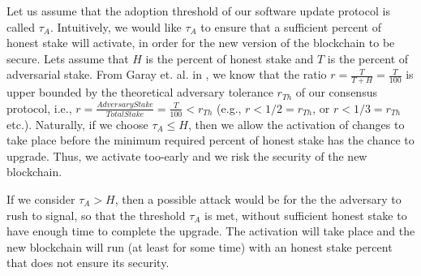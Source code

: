 Let us assume that the adoption threshold of our software update protocol is called $\tau_A$. %
 Intuitively, we would like $\tau_A$ to ensure that a sufficient percent of honest stake will activate, in order for the new version of the blockchain to be secure. Lets assume that $H$ is the percent of honest stake and $T$ is the percent of adversarial stake. From Garay et. al. in \cite{sok}, we know that the ratio $r = \frac{T}{T+H} = \frac{T}{100}$ is upper bounded by the theoretical adversary tolerance $r_{Th}$ of our consensus protocol, i.e., $r = \frac{AdversaryStake}{TotalStake} = \frac{T}{100} < r_{Th}$ (e.g., $r < 1/2 = r_{Th}$, or $r < 1/3 = r_{Th}$ etc.).
 Naturally, if we choose $\tau_A \leq H$, then we allow the activation of changes to take place before the minimum required percent of honest stake has the chance to upgrade. Thus, we activate too-early and we risk the security of the new blockchain. 

If we consider $\tau_A > H$, then a possible attack would be for the the adversary to rush to signal, so that the threshold $\tau_A$ is met, without sufficient honest stake to have enough time to complete the upgrade. The activation will take place and the new blockchain will run (at least for some time) with an honest stake percent that does not ensure its security. 

